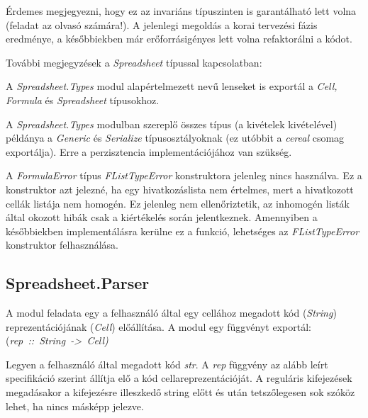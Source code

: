Érdemes megjegyezni, hogy ez az invariáns típuszinten is garantálható lett volna (feladat az olvasó számára!). A jelenlegi megoldás a korai tervezési fázis eredménye, a későbbiekben már erőforrásigényes lett volna refaktorálni a kódot.   

További megjegyzések a \textit{Spreadsheet} típussal kapcsolatban:
\begin{compactenum}
	\item A \textit{Spreadsheet.Types} modul alapértelmezett nevű lenseket is exportál a \textit{Cell, Formula} és \textit{Spreadsheet} típusokhoz.
	\item A \textit{Spreadsheet.Types} modulban szereplő összes típus (a kivételek kivételével) példánya a \textit{Generic} és \textit{Serialize} típusosztályoknak (ez utóbbit a \textit{cereal} csomag exportálja). Erre a perzisztencia implementációjához van szükség.
	\item A \textit{FormulaError} típus \textit{FListTypeError} konstruktora jelenleg nincs használva. Ez a konstruktor azt jelezné, ha egy hivatkozáslista nem értelmes, mert a hivatkozott cellák listája nem homogén. Ez jelenleg nem ellenőriztetik, az inhomogén listák által okozott hibák csak a kiértékelés során jelentkeznek. Amennyiben a későbbiekben implementálásra kerülne ez a funkció, lehetséges az \textit{FListTypeError} konstruktor felhasználása.
\end{compactenum} 

\subsection{Spreadsheet.Parser}

A modul feladata egy a felhasználó által egy cellához megadott kód (\textit{String}) reprezentációjának (\textit{Cell}) előállítása. A modul egy függvényt exportál: \mbox{(\textit{rep :: String -> Cell)}}

Legyen a felhasználó által megadott kód \textit{str}. A \textit{rep} függvény az alább leírt specifikáció szerint állítja elő a kód cellareprezentációját. A reguláris kifejezések megadásakor a kifejezésre illeszkedő string előtt és után tetszőlegesen sok szóköz lehet, ha nincs másképp jelezve.

